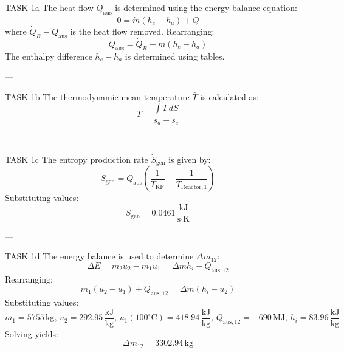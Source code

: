 TASK 1a  
The heat flow \( Q_{\text{aus}} \) is determined using the energy balance equation:  
\[
0 = \dot{m}(h_e - h_a) + \dot{Q}
\]  
where \( \dot{Q}_R - Q_{\text{aus}} \) is the heat flow removed. Rearranging:  
\[
Q_{\text{aus}} = \dot{Q}_R + \dot{m}(h_e - h_a)
\]  
The enthalpy difference \( h_e - h_a \) is determined using tables.

---

TASK 1b  
The thermodynamic mean temperature \( \bar{T} \) is calculated as:  
\[
\bar{T} = \frac{\int T \, dS}{s_a - s_e}
\]  

---

TASK 1c  
The entropy production rate \( \dot{S}_{\text{gen}} \) is given by:  
\[
\dot{S}_{\text{gen}} = Q_{\text{aus}} \left( \frac{1}{T_{\text{KF}}} - \frac{1}{T_{\text{Reactor},1}} \right)
\]  
Substituting values:  
\[
\dot{S}_{\text{gen}} = 0.0461 \, \frac{\text{kJ}}{\text{s·K}}
\]  

---

TASK 1d  
The energy balance is used to determine \( \Delta m_{12} \):  
\[
\Delta E = m_2 u_2 - m_1 u_1 = \Delta m h_i - Q_{\text{aus},12}
\]  
Rearranging:  
\[
m_1 (u_2 - u_1) + Q_{\text{aus},12} = \Delta m (h_i - u_2)
\]  
Substituting values:  
\[
m_1 = 5755 \, \text{kg}, \, u_2 = 292.95 \, \frac{\text{kJ}}{\text{kg}}, \, u_1(100^\circ\text{C}) = 418.94 \, \frac{\text{kJ}}{\text{kg}}, \, Q_{\text{aus},12} = -690 \, \text{MJ}, \, h_i = 83.96 \, \frac{\text{kJ}}{\text{kg}}
\]  
Solving yields:  
\[
\Delta m_{12} = 3302.94 \, \text{kg}
\]  